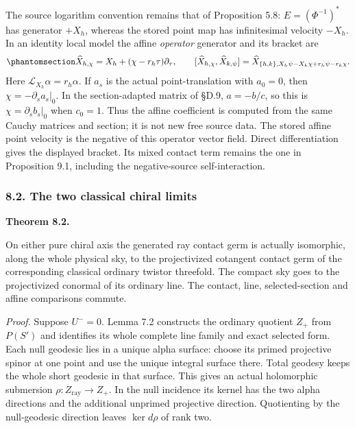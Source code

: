 \documentclass[
  english,
  11pt,
  reqno]{amsart}
\makeatletter
\newcommand{\pandocstatementheading}[1]{%
  \par\addpenalty{\@beginparpenalty}%
  \addvspace{.5\baselineskip plus .2\baselineskip minus .2\baselineskip}%
  {\normalfont\bfseries #1\par}%
  \nobreak\@afterindenttrue\@afterheading
}
\makeatother
\begin{document}
The source logarithm convention remains that of Proposition 5.8:
\(E=(\Phi^{-1})^*\) has generator \(+X_h\), whereas the stored point map
has infinitesimal velocity \(-X_h\). In an identity local model the
affine \emph{operator} generator and its bracket are
\begin{equation}\protect\phantomsection\label{eq:gg-affine-operator-bracket}{
 \widehat X_{h,\chi}=X_h+(\chi-r_h\tau)\partial_\tau,\qquad
 [\widehat X_{h,\chi},\widehat X_{k,\psi}]
  =\widehat X_{\{h,k\},
       X_h\psi-X_k\chi+r_h\psi-r_k\chi}.
}\end{equation} Here \(\mathcal L_{X_h}\alpha=r_h\alpha\). If \(a_s\) is
the actual point-translation with \(a_0=0\), then
\(\chi=-\partial_sa_s|_0\). In the section-adapted matrix of §D.9,
\(a=-b/c\), so this is \(\chi=\partial_sb_s|_0\) when \(c_0=1\). Thus
the affine coefficient is computed from the same Cauchy matrices and
section; it is not new free source data. The stored affine point
velocity is the negative of this operator vector field. Direct
differentiation gives the displayed bracket. Its mixed contact term
remains the one in Proposition 9.1, including the negative-source
self-interaction.

\protect{}\label{sec:gg-classical-cotangent-comparison}

\subsubsection{8.2. The two classical chiral
limits}\label{the-two-classical-chiral-limits}

\pandocstatementheading{\protect{}\label{thm:gg-actual-chiral-cotangent-atlas}Theorem 8.2.}

On either pure chiral axis the generated ray contact germ is actually
isomorphic, along the whole physical sky, to the projectivized cotangent
contact germ of the corresponding classical ordinary twistor threefold.
The compact sky goes to the projectivized conormal of its ordinary line.
The contact, line, selected-section and affine comparisons commute.

\emph{Proof.} Suppose \(U^-=0\). Lemma 7.2 constructs the ordinary
quotient \(Z_+\) from \(P(S')\) and identifies its whole complete line
family and exact selected form. Each null geodesic lies in a unique
alpha surface: choose its primed projective spinor at one point and use
the unique integral surface there. Total geodesy keeps the whole short
geodesic in that surface. This gives an actual holomorphic submersion
\(\rho:Z_{\mathrm{ray}}\to Z_+\). In the null incidence its kernel has
the two alpha directions and the additional unprimed projective
direction. Quotienting by the null-geodesic direction leaves
\(\ker d\rho\) of rank two.
\end{document}
